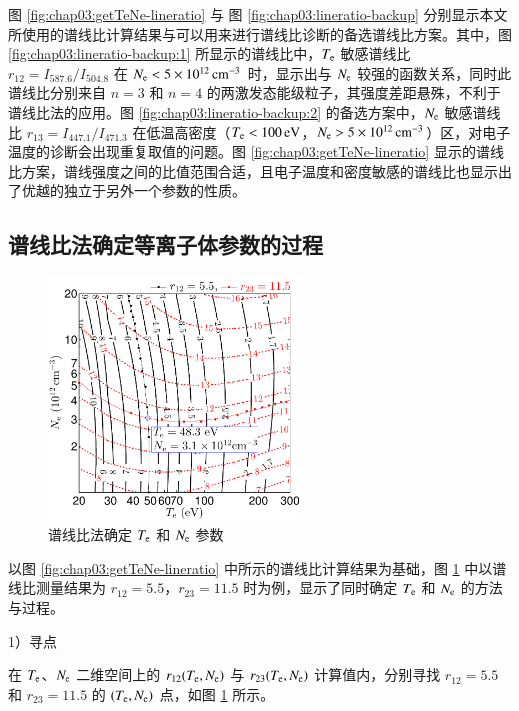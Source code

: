 图 \ref{fig:chap03:getTeNe-lineratio} 与 图 \ref{fig:chap03:lineratio-backup} 分别显示本文所使用的谱线比计算结果与可以用来进行谱线比诊断的备选谱线比方案。其中，图 \ref{fig:chap03:lineratio-backup:1} 所显示的谱线比中，$T_{\rm e}$ 敏感谱线比 $r_{12}=I_{587.6}/I_{504.8}$ 在 $N_{\rm e}<5\times10^{12}\,{\rm cm}^{-3}$ 时，显示出与 $N_{\rm e}$ 较强的函数关系，同时此谱线比分别来自 $n=3$ 和 $n=4$ 的两激发态能级粒子，其强度差距悬殊，不利于谱线比法的应用。图 \ref{fig:chap03:lineratio-backup:2} 的备选方案中，$N_{\rm e}$ 敏感谱线比 $r_{13}=I_{447.1}/I_{471.3}$ 在低温高密度（$T_{\rm e}<100\,{\rm eV}$，$N_{\rm e}>5\times10^{12}\,{\rm cm}^{-3}$）区，对电子温度的诊断会出现重复取值的问题。图 \ref{fig:chap03:getTeNe-lineratio} 显示的谱线比方案，谱线强度之间的比值范围合适，且电子温度和密度敏感的谱线比也显示出了优越的独立于另外一个参数的性质。

\subsection{谱线比法确定等离子体参数的过程}

\begin{figure}
  \centering
  \includegraphics[width=0.6\textwidth]{5-9to7-7to5-getTeNe-crosspoint.pdf}
  \caption{谱线比法确定 $T_{\rm e}$ 和 $N_{\rm e}$ 参数}
  \label{fig:chap03:getTeNe-cross-pnt}
\end{figure}

以图 \ref{fig:chap03:getTeNe-lineratio} 中所示的谱线比计算结果为基础，图 \ref{fig:chap03:getTeNe-cross-pnt} 中以谱线比测量结果为 $r_{12}=5.5$，$r_{23}=11.5$ 时为例，显示了同时确定 $T_{\rm e}$ 和 $N_{\rm e}$ 的方法与过程。

1）寻点

在 $T_{\rm e}$、$N_{\rm e}$ 二维空间上的 $r_{12}(T_{\rm e},N_{\rm e})$ 与 $r_{23}(T_{\rm e},N_{\rm e})$ 计算值内，分别寻找 $r_{12}=5.5$ 和 $r_{23}=11.5$ 的 $(T_{\rm e}, N_{\rm e})$ 点，如图 \ref{fig:chap03:getTeNe-cross-pnt} 所示。

